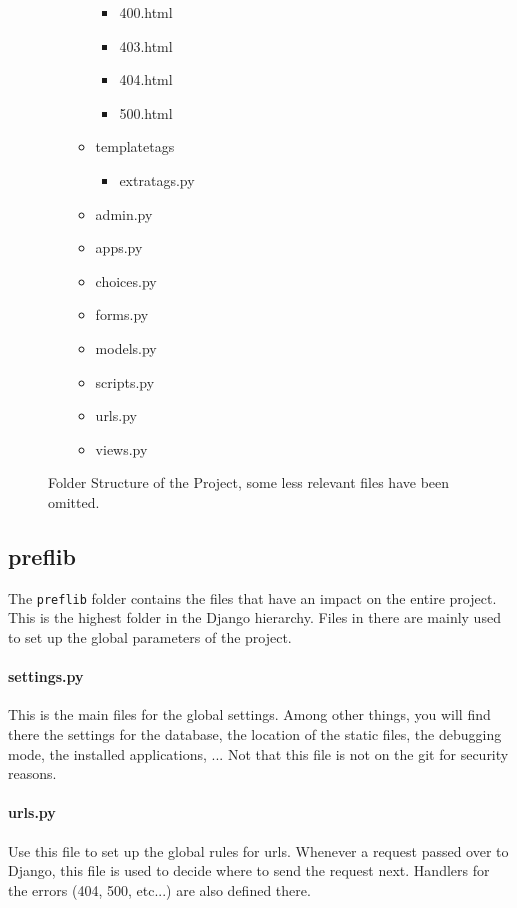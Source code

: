\documentclass{report}
\begin{document}
\begin{figure}
\begin{multicols}{2}
\begin{itemize}
\begin{itemize}
\begin{itemize}
						\item[\faFileO] 400.html
						\item[\faFileO] 403.html
						\item[\faFileO] 404.html
						\item[\faFileO] 500.html
					\end{itemize}
					\item[\faFolderO] templatetags
					\begin{itemize}
						\item[\faFileO] extratags.py
					\end{itemize}
					\item[\faFileO] admin.py
					\item[\faFileO] apps.py
					\item[\faFileO] choices.py
					\item[\faFileO] forms.py
					\item[\faFileO] models.py
					\item[\faFileO] scripts.py
					\item[\faFileO] urls.py
					\item[\faFileO] views.py
				\end{itemize}
			\end{itemize}
		\end{multicols}
		\caption{Folder Structure of the Project, some less relevant files have been omitted.}
		\label{fig:folderStruct}
	\end{figure}

	\subsection*{\faFolderO{}  preflib}
	
	The \texttt{preflib} folder contains the files that have an impact on the entire project. This is the highest folder in the Django hierarchy. Files in there are mainly used to set up the global parameters of the project.
	
	\paragraph*{\faFileO{} settings.py} This is the main files for the global settings. Among other things, you will find there the settings for the database, the location of the static files, the debugging mode, the installed applications, ... Not that this file is not on the git for security reasons.
	
	\paragraph*{\faFileO{} urls.py} Use this file to set up the global rules for urls. Whenever a request passed over to Django, this file is used to decide where to send the request next. Handlers for the errors (404, 500, etc...) are also defined there.
	
\end{document}
